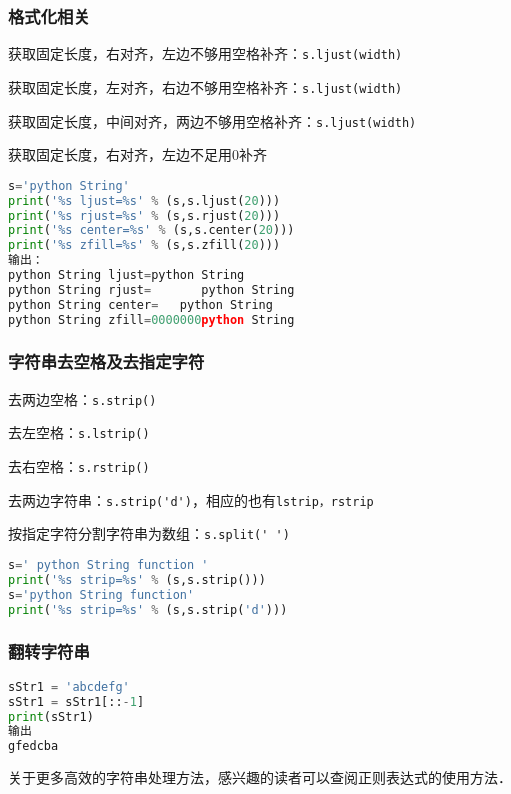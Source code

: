 \subsubsection{格式化相关}
获取固定长度，右对齐，左边不够用空格补齐：\verb|s.ljust(width)|

获取固定长度，左对齐，右边不够用空格补齐：\verb|s.ljust(width)|

获取固定长度，中间对齐，两边不够用空格补齐：\verb|s.ljust(width)|

获取固定长度，右对齐，左边不足用0补齐

\begin{lstlisting}[language=python]
s='python String'
print('%s ljust=%s' % (s,s.ljust(20)))
print('%s rjust=%s' % (s,s.rjust(20)))
print('%s center=%s' % (s,s.center(20)))
print('%s zfill=%s' % (s,s.zfill(20)))
输出：
python String ljust=python String       
python String rjust=       python String
python String center=   python String    
python String zfill=0000000python String

\end{lstlisting}



\subsubsection{字符串去空格及去指定字符}

去两边空格：\verb|s.strip()|

去左空格：\verb|s.lstrip()|

去右空格：\verb|s.rstrip()|

去两边字符串：\verb|s.strip('d')|，相应的也有\verb|lstrip，rstrip|

按指定字符分割字符串为数组：\verb|s.split(' ')|

\begin{lstlisting}[language=python]
s=' python String function '
print('%s strip=%s' % (s,s.strip()))
s='python String function'
print('%s strip=%s' % (s,s.strip('d')))
\end{lstlisting}



\subsubsection{翻转字符串}
\begin{lstlisting}[language=python]
sStr1 = 'abcdefg'
sStr1 = sStr1[::-1]
print(sStr1)
输出
gfedcba
\end{lstlisting}

关于更多高效的字符串处理方法，感兴趣的读者可以查阅正则表达式的使用方法．
